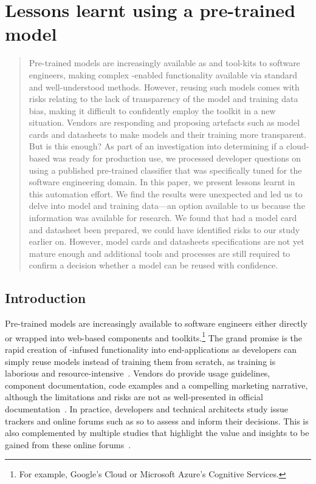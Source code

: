 \chapter[Lessons learnt using a pre-trained \glsac{ai} model]
{Lessons learnt using a pre-trained  model}
\label{ch:ase2020-industry}
\graphicspath{{mainmatter/publications/figures/ase-industry2020/}}

\glsresetall
\begin{abstract}
Pre-trained  models are increasingly available as  and tool-kits to software engineers, making complex -enabled functionality available via standard and well-understood methods. However, reusing such models comes with risks relating to the lack of transparency of the model and training data bias, making it difficult to confidently employ the toolkit in a new situation.  Vendors are responding and proposing artefacts such as model cards and datasheets to make models and their training more transparent.  But is this enough?  As part of an investigation into determining if a cloud-based  was ready for production use, we processed developer questions on  using a published pre-trained classifier that was specifically tuned for the software engineering domain. In this paper, we present lessons learnt in this automation effort. We find the results were unexpected and led us to delve into model and training data---an option available to us because the information was available for research.  We found that had a model card and datasheet been prepared, we could have identified risks to our study earlier on. However, model cards and datasheets specifications are not yet mature enough and additional tools and processes are still required to confirm a decision whether a model can be reused with confidence.
\end{abstract}
\glsresetall

\section{Introduction}
Pre-trained  models are increasingly available to software engineers either directly or wrapped into web-based components and toolkits.\footnote{For example, Google's Cloud  or Microsoft Azure's Cognitive Services.} The grand promise is the rapid creation of -infused functionality into end-applications as developers can simply reuse models instead of training them from scratch, as training is laborious and resource-intensive~\citep{RamanAnandHoder2015}. Vendors do provide usage guidelines, component documentation, code examples and a compelling marketing narrative, although the limitations and risks are not as well-presented in  official documentation~\citep{Cummaudo:2019icsme,Cummaudo:2020icse}. 
In practice, developers and technical architects study issue trackers and online forums such as \gls{so} to assess and inform their decisions. This is also complemented by multiple studies that highlight the value and insights to be gained from these online forums~\citep{Abdalkareem2017WhatOverflow,Storey2014}.

